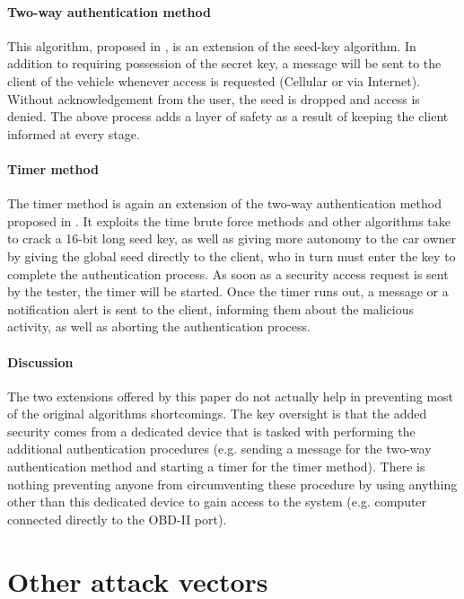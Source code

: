 \paragraph{Two-way authentication method}
This algorithm, proposed in \cite{Yadav16}, is an extension of the seed-key algorithm. In addition to requiring possession of the secret key, a message will be sent to the client of the vehicle whenever access is requested (Cellular or via Internet). Without acknowledgement from the user, the seed is dropped and access is denied. The above process adds a layer of safety as a result of keeping the client informed at every stage.

\paragraph{Timer method}  
The timer method is again an extension of the two-way authentication method proposed in \cite{Yadav16}. It exploits the time brute force methods and other algorithms take to crack a 16-bit long seed key, as well as giving more autonomy to the car owner by giving the global seed directly to the client, who in turn must enter the key to complete the authentication process. As soon as a security access request is sent by the tester, the timer will be started. Once the timer runs out, a message or a notification alert is sent to the client, informing them about the malicious activity, as well as aborting the authentication process. 

\paragraph{Discussion} 
The two extensions offered by this paper do not actually help in preventing most of the original algorithms shortcomings. The key oversight is that the added security comes from a dedicated device that is tasked with performing the additional authentication procedures (e.g. sending a message for the two-way authentication method and starting a timer for the timer method). There is nothing preventing anyone from circumventing these procedure by using anything other than this dedicated device to gain access to the system (e.g. computer connected directly to the OBD-II port). 

\section{Other attack vectors}
\label{sec:other_attack_vectors}

